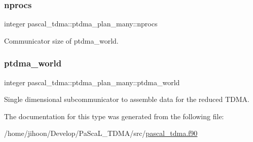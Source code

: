 \subsubsection{\texorpdfstring{nprocs}{nprocs}}
{\footnotesize\ttfamily integer pascal\+\_\+tdma\+::ptdma\+\_\+plan\+\_\+many\+::nprocs}



Communicator size of ptdma\+\_\+world. 

\mbox{\label{structpascal__tdma_1_1ptdma__plan__many_acb7e645e37c791564905c6e2808db0c6}} 
\subsubsection{\texorpdfstring{ptdma\+\_\+world}{ptdma\_world}}
{\footnotesize\ttfamily integer pascal\+\_\+tdma\+::ptdma\+\_\+plan\+\_\+many\+::ptdma\+\_\+world}



Single dimensional subcommunicator to assemble data for the reduced T\+D\+MA. 



The documentation for this type was generated from the following file\+:\begin{DoxyCompactItemize}
\item 
/home/jihoon/\+Develop/\+Pa\+Sca\+L\+\_\+\+T\+D\+M\+A/src/\hyperlink{pascal__tdma_8f90}{pascal\+\_\+tdma.\+f90}\end{DoxyCompactItemize}

